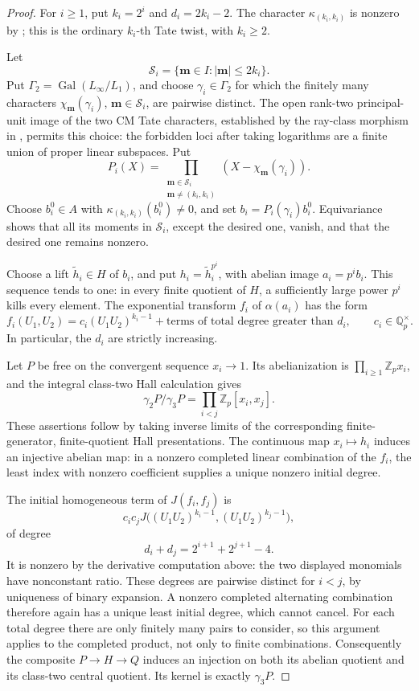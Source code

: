\documentclass[11pt]{article}
\theoremstyle{definition}\newtheorem{definition}[theorem]{Definition}
\begin{document}
\begin{proof}
For \(i\ge1\), put \(k_i=2^i\) and
\(d_i=2k_i-2\).  The character
\(\kappa_{(k_i,k_i)}\) is nonzero by
\cite[Theorem 2.8(2) and the Soul\'e-finiteness paragraph,
p.~9]{Ishii}; this is the ordinary \(k_i\)-th
Tate twist, with \(k_i\ge2\).

Let
\[
 \mathcal S_i=\{\boldsymbol m\in I:
                              |\boldsymbol m|\le2k_i\}.
\]
Put \(\Gamma_2=\operatorname{Gal}(L_\infty/L_1)\), and choose \(\gamma_i\in\Gamma_2\) for which the finitely
many characters \(\chi_{\boldsymbol m}(\gamma_i)\),
\(\boldsymbol m\in\mathcal S_i\), are pairwise distinct.
The open rank-two principal-unit image of the two CM
Tate characters, established by the ray-class morphism
in \cite[pp.~4--5]{Ishii}, permits this choice:
the forbidden loci after taking logarithms are a finite
union of proper linear subspaces.  Put
\[
 P_i(X)=\prod_{\substack{\boldsymbol m\in\mathcal S_i\\
                         \boldsymbol m\ne(k_i,k_i)}}
                 (X-\chi_{\boldsymbol m}(\gamma_i)).
\]
Choose \(b_i^0\in A\) with
\(\kappa_{(k_i,k_i)}(b_i^0)\ne0\), and set
\(b_i=P_i(\gamma_i)b_i^0\).  Equivariance shows that
all its moments in \(\mathcal S_i\), except the desired
one, vanish, and that the desired one remains nonzero.

Choose a lift \(\widetilde h_i\in H\) of \(b_i\), and
put \(h_i=\widetilde h_i^{p^i}\), with abelian image
\(a_i=p^ib_i\).  This sequence tends to one: in every
finite quotient of \(H\), a sufficiently large power
\(p^i\) kills every element.  The exponential transform
\(f_i\) of \(\alpha(a_i)\) has the form
\[
 f_i(U_1,U_2)=c_i(U_1U_2)^{k_i-1}
                    +\text{terms of total degree greater than }d_i,
 \qquad c_i\in\mathbb Q_p^\times.
\]
In particular, the \(d_i\) are strictly increasing.

Let \(P\) be free on the convergent sequence
\(x_i\to1\).  Its abelianization is
\(\prod_{i\ge1}\mathbb Z_p x_i\), and the integral
class-two Hall calculation gives
\[
 \gamma_2P/\gamma_3P
       =\prod_{i<j}\mathbb Z_p[x_i,x_j].
\]
These assertions follow by taking inverse limits of
the corresponding finite-generator, finite-quotient
Hall presentations.  The continuous map \(x_i\mapsto h_i\)
induces an injective abelian map: in a nonzero completed
linear combination of the \(f_i\), the least index
with nonzero coefficient supplies a unique nonzero
initial degree.

The initial homogeneous term of \(J(f_i,f_j)\) is
\[
 c_ic_j J\bigl((U_1U_2)^{k_i-1},
              (U_1U_2)^{k_j-1}\bigr),
\]
of degree
\[
 d_i+d_j=2^{i+1}+2^{j+1}-4.
\]
It is nonzero by the derivative computation above:
the two displayed monomials have nonconstant ratio.
These degrees are pairwise distinct for \(i<j\), by
uniqueness of binary expansion.  A nonzero completed
alternating combination therefore again has a unique
least initial degree, which cannot cancel.
For each total degree there are only finitely many
pairs to consider, so this argument applies to the
completed product, not only to finite combinations.
Consequently the composite
\(P\to H\to Q\) induces an injection on both its
abelian quotient and its class-two central quotient.
Its kernel is exactly \(\gamma_3P\).


\end{proof}
\end{document}
